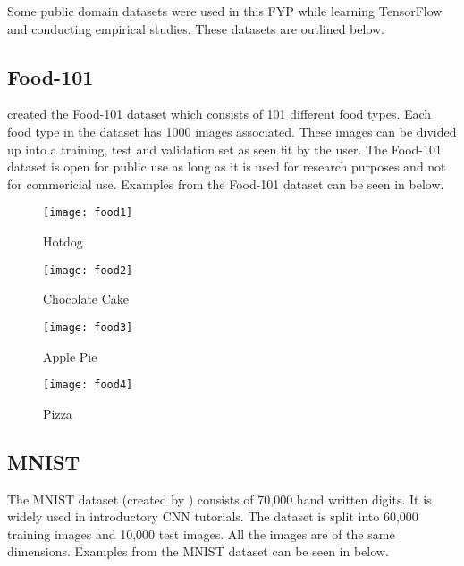 Some public domain datasets were used in this FYP while learning TensorFlow and conducting empirical studies.
These datasets are outlined below.
\tocless\subsection{Food-101}
\parencite{food101} created the Food-101 dataset which consists of 101 different food types.
Each food type in the dataset has 1000 images associated.
These images can be divided up into a training, test and validation set as seen fit by the user.
The Food-101 dataset is open for public use as long as it is used for research purposes and not for commericial use.
Examples from the Food-101 dataset can be seen in below.

\begin{figure}[h] 
  \label{food} 
  \begin{minipage}[b]{0.25\linewidth}
    \centering
    \texttt{[image: food1]} 
    \caption{Hotdog} 
    \vspace{4ex}
  \end{minipage}%
  \begin{minipage}[b]{0.25\linewidth}
    \centering
    \texttt{[image: food2]} 
    \caption{Chocolate Cake} 
  \label{fig:page2}
    \vspace{4ex}
  \end{minipage} 
  \begin{minipage}[b]{0.25\linewidth}
    \centering
    \texttt{[image: food3]} 
    \caption{Apple Pie} 
    \vspace{4ex}
  \end{minipage}%
  \begin{minipage}[b]{0.25\linewidth}
    \centering
    \texttt{[image: food4]} 
    \caption{Pizza} 
    \vspace{4ex}
  \end{minipage} 
\end{figure}

\tocless\subsection{MNIST}
The MNIST dataset (created by \parencite{mnist}) consists of 70,000 hand written digits.
It is widely used in introductory CNN tutorials.
The dataset is split into 60,000 training images and 10,000 test images.
All the images are of the same dimensions.
Examples from the MNIST dataset can be seen in below.

